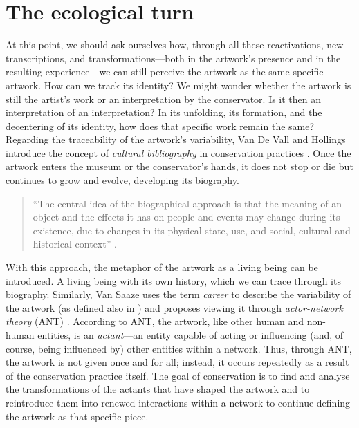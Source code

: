 \section{The ecological turn}
At this point, we should ask ourselves how, through all these reactivations, new transcriptions, and transformations—both in the artwork’s presence and in the resulting experience—we can still perceive the artwork as the same specific artwork. How can we track its identity? We might wonder whether the artwork is still the artist’s work or an interpretation by the conservator. Is it then an interpretation of an interpretation? In its unfolding, its formation, and the decentering of its identity, how does that specific work remain the same?\\
Regarding the traceability of the artwork’s variability, Van De Vall and Hollings introduce the concept of \textit{cultural bibliography} in conservation practices \cite{van2011reflections}. Once the artwork enters the museum or the conservator’s hands, it does not stop or die but continues to grow and evolve, developing its biography.
\begin{quote}
“The central idea of the biographical approach is that the meaning of an object and the effects it has on people and events may change during its existence, due to changes in its physical state, use, and social, cultural and historical context” \cite{van2011reflections}.  
\end{quote}
With this approach, the metaphor of the artwork as a living being can be introduced. A living being with its own history, which we can trace through its biography. Similarly, Van Saaze uses the term \textit{career} to describe the variability of the artwork (as defined also in \cite{becker2006art}) and proposes viewing it through \textit{actor-network theory} (ANT) \cite{van2013installation}. According to ANT, the artwork, like other human and non-human entities, is an \textit{actant}—an entity capable of acting or influencing (and, of course, being influenced by) other entities within a network. Thus, through ANT, the artwork is not given once and for all; instead, it occurs repeatedly as a result of the conservation practice itself. The goal of conservation is to find and analyse the transformations of the actants that have shaped the artwork and to reintroduce them into renewed interactions within a network to continue defining the artwork as that specific piece.\\
